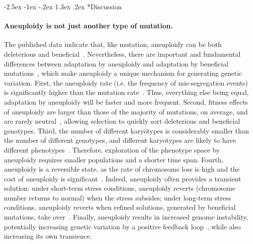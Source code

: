 \documentclass[12pt]{extarticle}
\makeatletter
\renewcommand\section{\@startsection {section}{1}{\z@}%
     {-2.5ex \@plus -1ex \@minus -.2ex}%
     {1.3ex \@plus.2ex}%
    {\Large\bfseries}}
\makeatother
\begin{document}
\pagebreak
\section*{Discussion}

\paragraph*{Aneuploidy is not just another type of mutation.}
The published data indicate that, like mutation, aneuploidy can be both deleterious and beneficial~\citep{Pavelka2010, Sheltzer2011}.
Nevertheless, there are important and fundamental differences between adaptation by aneuploidy
and adaptation by beneficial mutations~\citep{Yona2015}, which make aneuploidy a unique mechanism for generating genetic
variation.
First, the aneuploidy rate (i.e. the frequency of mis-segregation events) is significantly higher than the
mutation rate~\citep{Santaguida2015review}.
Thus, everything else being equal, adaptation by aneuploidy will be faster and more frequent.
Second, fitness effects of aneuploidy are larger than those of the majority of mutations, on average, and are rarely
neutral~\citep{Pavelka2010, Yona2012, Sunshine2015}, allowing selection to quickly sort deleterious and beneficial genotypes.
Third, the number of different karyotypes is considerably smaller than the number of different genotypes, and different karyotypes are likely to have different phenotypes~\citep{Pavelka2010}.
Therefore, exploration of the phenotype space by aneuploidy requires smaller populations and a shorter time span.
Fourth, aneuploidy is a reversible state, as the rate of chromosome loss is high and the cost of aneuploidy is significant~\citep{Niwa2006}.
Indeed, aneuploidy often provides a transient solution: under short-term stress conditions, aneuploidy reverts (chromosome number returns to normal) when the stress subsides; under long-term stress conditions, aneuploidy reverts when refined solutions, generated by beneficial mutations, take over~\citep{Yona2012}.
Finally, aneuploidy results in increased genome instability, potentially increasing genetic variation by a positive feedback loop~\citep{Rancati2013, Bouchonville2009, Zhu2012}, while also increasing its own transience.
\end{document}
